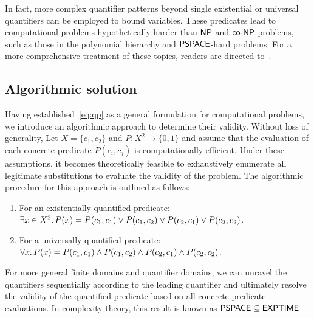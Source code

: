 In fact, more complex quantifier patterns beyond single existential or universal quantifiers can be employed to bound variables. These predicates lead to computational problems hypothetically harder than $\mathsf{NP}$ and $\mathsf{co{\text -}NP}$ problems, such as those in the polynomial hierarchy and $\mathsf{PSPACE}$-hard problems. For a more comprehensive treatment of these topics, readers are directed to~\citet{arora_complexity}.


\subsection{Algorithmic solution}\label{sec:algo}
Having established~\cref{eq:qp} as a general formulation for computational problems, we introduce an algorithmic approach to determine their validity. Without loss of generality,
Let $X = \{c_1, c_2\}$ and $P: X^2\rightarrow \{0, 1\}$ and assume that the evaluation of each concrete predicate $P(c_i,c_j)$ is computationally efficient. Under these assumptions, it becomes theoretically feasible to exhaustively enumerate all legitimate substitutions to evaluate the validity of the problem. The algorithmic procedure for this approach is outlined as follows:
\begin{enumerate}
[parsep=0pt,itemsep=1pt,leftmargin=13pt]
\item For an existentially quantified predicate:
$\exists x \in X^2 \ldotp P(x) = P(c_1, c_1) \lor P(c_1, c_2) \lor P(c_2, c_1) \lor P(c_2, c_2)$.
\item For a universally quantified predicate:
$\forall x \ldotp P(x) = P(c_1, c_1) \land P(c_1, c_2) \land P(c_2, c_1) \land P(c_2, c_2)$.
\end{enumerate}
For more general finite domains and quantifier domains, we can unravel the quantifiers sequentially according to the leading quantifier and ultimately resolve the validity of the quantified predicate based on all concrete predicate evaluations. In complexity theory, this result is known as $\mathsf{PSPACE}\subseteq\mathsf{EXPTIME}$~\citep{arora_complexity}. %


